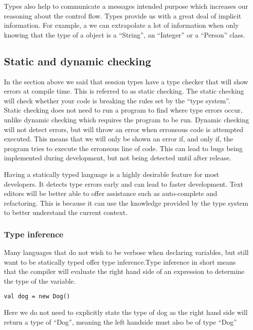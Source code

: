 Types also help to communicate a messages intended purpose which increases our reasoning about the control flow. Types provide us with a great deal of implicit information. For example, a we can extrapolate a lot of information when only knowing that the type of a object is a ``String'', an ``Integer'' or a ``Person'' class.

\subsection{Static and dynamic checking}
In the section above we said that session types have a type checker that will show errors at compile time. This is referred to as static checking. The static checking will check whether your code is breaking the rules set by the ``type system''. Static checking does not need to run a program to find where type errors occur,  unlike dynamic checking which requires the program to be run. Dynamic checking will not detect errors, but will throw an error when erroneous code is attempted executed. This means that we will only be shown an error if, and only if, the program tries to execute the erroneous line of code. This can lead to bugs being implemented during development, but not being detected until after release. 

Having a statically typed language is a highly desirable feature for most developers. It detects type errors early and can lead to faster development. Text editors will be better able to offer assistance such as auto-complete and refactoring. This is because it can use the knowledge provided by the type system to better understand the current context.

\subsubsection{Type inference}
Many languages that do not wish to be verbose when declaring variables, but still want to be statically typed offer type inference.Type inference in short means that the compiler will evaluate the right hand side of an expression to determine the type of the variable.
\begin{lstlisting}[style=myScalastyle]
val dog = new Dog()
\end{lstlisting}
Here we do not need to explicitly state the type of dog as the right hand side will return a type of ``Dog'', meaning the left handside must also be of type ``Dog''


